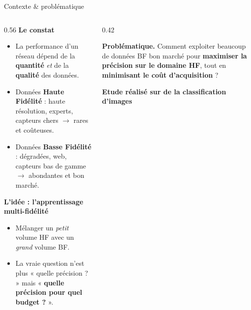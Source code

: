 \documentclass[aspectratio=169, 11pt]{beamer}
\begin{document}
\begin{frame}{Contexte \& problématique}
  \begin{columns}[T]
    \begin{column}{0.56\textwidth}
      \textbf{Le constat}
      \begin{itemize}
        \item La performance d'un réseau dépend de la \textbf{quantité} \emph{et} de la \textbf{qualité} des données.
        \item Données \textbf{Haute Fidélité} : haute résolution, experts, capteurs chers $\rightarrow$ \textcolor{danger}{rares et coûteuses}.
        \item Données \textbf{Basse Fidélité} : dégradées, web, capteurs bas de gamme $\rightarrow$ \textcolor{success}{abondantes et bon marché}.
      \end{itemize}
      \vspace{0.3em}
      \textbf{L'idée : l'apprentissage multi-fidélité}
      \begin{itemize}
        \item Mélanger un \emph{petit} volume HF avec un \emph{grand} volume BF.
        \item La vraie question n'est plus « quelle précision ? » mais
        « \textbf{quelle précision pour quel budget ?} ».
      \end{itemize}
    \end{column}
    \begin{column}{0.42\textwidth}
      \begin{key}
        \textbf{Problématique.} Comment exploiter beaucoup de données BF bon marché
        pour \textbf{maximiser la précision sur le domaine HF}, tout en
        \textbf{minimisant le coût d'acquisition} ?
      \end{key}
      \vspace{0.5em}
      \begin{center}
        \footnotesize\color{utbmdark}\textbf{Etude réalisé sur de la classification d'images}\\[2pt]
      \end{center}
    \end{column}
  \end{columns}
\end{frame}
\end{document}
